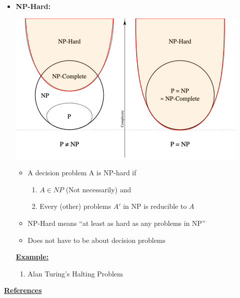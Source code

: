 \documentclass[12pt]{article}
\begin{document}
\begin{enumerate}[1.]
\begin{itemize}
        \item \textbf{NP-Hard:}

        \bigskip

        \begin{center}
        \includegraphics[width=0.7\linewidth]{images/worksheet_7_solution_4.png}
        \end{center}

        \begin{itemize}
            \item A decision problem A is NP-hard if

            \begin{enumerate}[1)]
                \item $A \in NP$ (Not necessarily) and
                \item Every (other) problems $A'$ in NP is reducible to $A$
            \end{enumerate}
            \item NP-Hard means ``at least as hard as any problems in NP''
            \item Does not have to be about decision problems
        \end{itemize}

        \underline{\textbf{Example:}}

        \bigskip

        \begin{enumerate}[1)]
            \item Alan Turing's Halting Problem
        \end{enumerate}

    \end{itemize}

    \bigskip

    \underline{\textbf{References}}

    \bigskip


\end{enumerate}
\end{document}
